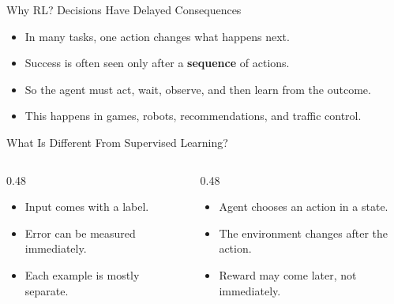 \documentclass[aspectratio=169]{beamer}
\newcommand{\defaultdeckrefs}{AIMA4e Ch.22 pp.789--822; Poole3e Ch.13 pp.583--608}
\newcommand{\currentsliderefs}{\defaultdeckrefs}
\newcommand{\setslideref}[1]{\gdef\currentsliderefs{#1}}
\begin{document}
\setslideref{AIMA4e Ch.22 pp.789--822; Poole3e Ch.13 pp.583--608}
\begin{frame}{Why RL? Decisions Have Delayed Consequences}
\begin{itemize}
  \item In many tasks, one action changes what happens next.
  \item Success is often seen only after a \textbf{sequence} of actions.
  \item So the agent must act, wait, observe, and then learn from the outcome.
  \item This happens in games, robots, recommendations, and traffic control.
\end{itemize}
\end{frame}

\setslideref{AIMA4e Ch.22 pp.789--822; Poole3e Ch.13 pp.583--608}
\begin{frame}{What Is Different From Supervised Learning?}
\begin{columns}[T,onlytextwidth]
  \begin{column}{0.48\textwidth}
    \begin{tcolorbox}[colback=questionbg,colframe=questionframe,boxrule=0.7pt,title=Supervised Learning]
    \begin{itemize}
      \item Input comes with a label.
      \item Error can be measured immediately.
      \item Each example is mostly separate.
    \end{itemize}
    \end{tcolorbox}
  \end{column}
  \begin{column}{0.48\textwidth}
    \begin{tcolorbox}[colback=plainbg,colframe=plainframe,boxrule=0.7pt,title=Reinforcement Learning]
    \begin{itemize}
      \item Agent chooses an action in a state.
      \item The environment changes after the action.
      \item Reward may come later, not immediately.
    \end{itemize}
    \end{tcolorbox}
  \end{column}
\end{columns}
\end{frame}
\end{document}
